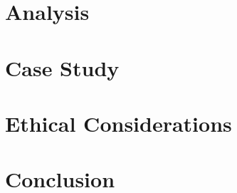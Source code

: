 \section{Analysis}


\section{Case Study}


\section{Ethical Considerations}


\section{Conclusion}


%

\endinput